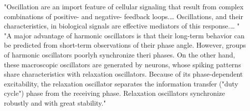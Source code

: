 \documentclass[8pt,a4paper]{article}
\begin{document}
"Oscillation are an import feature of cellular signaling that result from complex combinations of positive- and negative- feedback loops.\dots 
Oscillations, and their characteristics, in biological signals are effective mediators of this response.\dots 
"  \cite{bae2016} \\

"A major advantage of harmonic oscillators is that their long-term behavior can be predicted from short-term observations of their phase angle. 
However, groups of harmonic oscillators poorlyh synchronize theri phases. 
On the other hand, these macroscopic oscillators are generated by neurons, 
whose spiking patterns share characteristics with relaxation oscillators. 
Because of its phase-dependent excitability, 
the relaxation oscillator separates the information transfer ("duty cycle") phase from the receiving phase. 
Relaxation oscillators synchronize robustly and with great stability." \cite{buzsaki2004} \\
\end{document}
